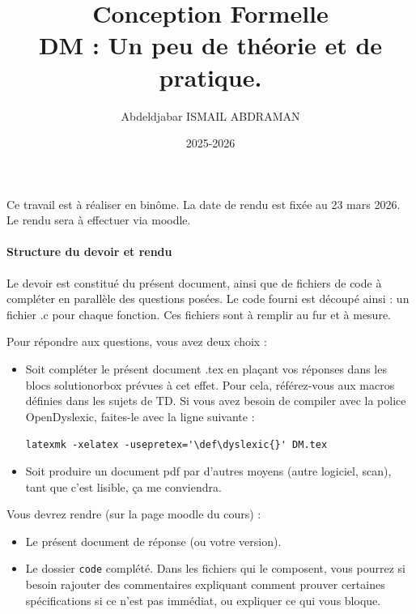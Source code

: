 \documentclass[11pt,answers]{exam}
\author{Abdeldjabar ISMAIL ABDRAMAN}
\date{2025-2026}
\title{{\bf Conception Formelle} \\ DM : Un peu de théorie et de pratique.}
\begin{document}
\maketitle

Ce travail est à réaliser en binôme. La date de rendu est fixée au 23 mars 2026. Le rendu sera à effectuer via moodle.




\paragraph{Structure du devoir et rendu}

Le devoir est constitué du présent document, ainsi que de fichiers de code à compléter en parallèle des questions posées.
Le code fourni est découpé ainsi : un fichier .c pour chaque fonction.
Ces fichiers sont à remplir au fur et à mesure.

Pour répondre aux questions, vous avez deux choix :
\begin{itemize}
    \item Soit compléter le présent document .tex en plaçant vos réponses dans les blocs solutionorbox prévues à cet effet. Pour cela, référez-vous aux macros définies dans les sujets de TD. Si vous avez besoin de compiler avec la police OpenDyslexic, faites-le avec la ligne suivante : 
    
    \verb#latexmk -xelatex -usepretex='\def\dyslexic{}' DM.tex#
    \item Soit produire un document pdf par d’autres moyens (autre logiciel, scan), tant que c’est lisible, ça me conviendra.
\end{itemize}

Vous devrez rendre (sur la page moodle du cours) :
\begin{itemize}
    \item Le présent document de réponse (ou votre version).
    \item Le dossier \texttt{code} complété. Dans les fichiers qui le composent, vous pourrez si besoin rajouter des commentaires expliquant comment prouver certaines spécifications si ce n’est pas immédiat, ou expliquer ce qui vous bloque.
\end{itemize}
\end{document}
